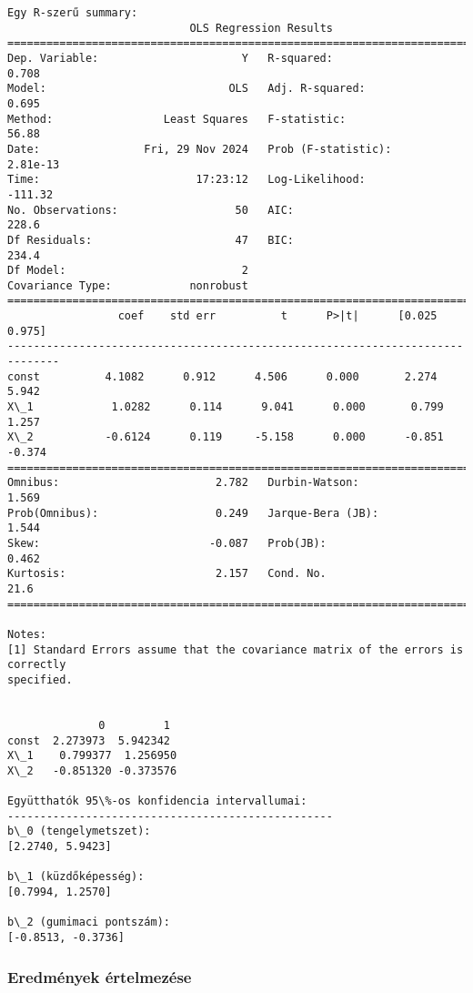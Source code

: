 \documentclass[11pt]{article}
\begin{document}
    \begin{Verbatim}[commandchars=\\\{\}]
Egy R-szerű summary:
                            OLS Regression Results
==============================================================================
Dep. Variable:                      Y   R-squared:                       0.708
Model:                            OLS   Adj. R-squared:                  0.695
Method:                 Least Squares   F-statistic:                     56.88
Date:                Fri, 29 Nov 2024   Prob (F-statistic):           2.81e-13
Time:                        17:23:12   Log-Likelihood:                -111.32
No. Observations:                  50   AIC:                             228.6
Df Residuals:                      47   BIC:                             234.4
Df Model:                           2
Covariance Type:            nonrobust
==============================================================================
                 coef    std err          t      P>|t|      [0.025      0.975]
------------------------------------------------------------------------------
const          4.1082      0.912      4.506      0.000       2.274       5.942
X\_1            1.0282      0.114      9.041      0.000       0.799       1.257
X\_2           -0.6124      0.119     -5.158      0.000      -0.851      -0.374
==============================================================================
Omnibus:                        2.782   Durbin-Watson:                   1.569
Prob(Omnibus):                  0.249   Jarque-Bera (JB):                1.544
Skew:                          -0.087   Prob(JB):                        0.462
Kurtosis:                       2.157   Cond. No.                         21.6
==============================================================================

Notes:
[1] Standard Errors assume that the covariance matrix of the errors is correctly
specified.


              0         1
const  2.273973  5.942342
X\_1    0.799377  1.256950
X\_2   -0.851320 -0.373576

Együtthatók 95\%-os konfidencia intervallumai:
--------------------------------------------------
b\_0 (tengelymetszet):
[2.2740, 5.9423]

b\_1 (küzdőképesség):
[0.7994, 1.2570]

b\_2 (gumimaci pontszám):
[-0.8513, -0.3736]
    \end{Verbatim}

    \subsubsection{Eredmények
értelmezése}\label{eredmuxe9nyek-uxe9rtelmezuxe9se}
\end{document}
